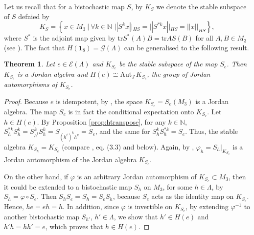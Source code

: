 \documentclass[12pt]{article}
\theoremstyle{plain}
\newtheorem{theorem}{Theorem}
\theoremstyle{definition}
\theoremstyle{remark}
\numberwithin{equation}{section}
\begin{document}
Let us recall that for a bistochastic map $S$, by 
$K_{S}$ we denote the stable subspace of $S$ defnied by
\begin{equation}
    K_{S} = \left \{ x \in M_{3} \:|\:
            \forall k \in \mathbb{N} \,\,
            || S^{k} x ||_{HS} = || S^{*k} x ||_{HS} =  ||x||_{HS}
    \right \},
\end{equation}
where $S^{*}$ is the adjoint map given by
$\text{tr} S^{*}(A) B = \text{tr} A S(B)$ for all $A, B \in M_{3}$
(see \cite[Eq. (3.3)]{miller2015stable}).
The fact that $H(\mathbf{1}_{8}) = \mathcal{G}(\Lambda)$
can be generalised to the following result.
\begin{theorem}
    Let $e \in \mathcal{E}(\Lambda)$ and
    $K_{S_{e}}$ be the stable subspace of the map $S_{e}$.
    Then $K_{S_{e}}$ is a Jordan algebra and
    $H(e) \cong \text{Aut}_{J} \, K_{S_{e}}$,
    the group of Jordan automorphisms of $K_{S_{e}}$.
\end{theorem}
\begin{proof}
    Because $e$ is idempotent, by
    \cite[Corollary 3]{miller2015stable},
    the space $K_{S_{e}} = S_{e}(M_{3})$ is a Jordan algebra.
    The map $S_{e}$ is in fact the conditional expectation onto $K_{S_{e}}$.
    Let $h \in H(e)$.
    By Proposition \ref{prop:htranspose}, for any $k\in \mathbb{N}$,
    $S_{h}^{* k} S_{h}^{k} = S_{h^{t}}^{k} S_{h}^{k} =  S_{(h^{t})^{k} h^{k}} = S_{e}$,
    and the same for $S_{h}^{k} S_{h}^{* k}= S_{e}$.
    Thus, the stable algebra $K_{S_{h}} = K_{S_{e}}$
    (compare \cite{miller2015stable}, eq. (3.3) and below).   
    Again, by \cite[Corollary 3]{miller2015stable},
    $\varphi_{h} = S_{h} \big |_{K_{S_{e}}}$
    is a Jordan automorphism of the Jordan algebra $K_{S_{e}}$.

    On the other hand, if
    $\varphi$ is an arbitrary Jordan automorphism of $K_{S_{e}} \subset M_{3}$,
    then it could be extended to a bistochastic map $S_{h}$ on $M_{3}$,
    for some $h \in \Lambda$,
    by $S_{h} = \varphi \circ S_{e}$.
    Then
    $S_{h} S_{e} = S_{h} = S_{e} S_{h}$,
    because $S_{e}$ acts as the identity map on $K_{S_{e}}$.
    Hence, $he = eh = h$.
    In addition, since $\varphi$ is invertible on $K_{S_{e}}$,
    by extending $\varphi^{-1}$ to another bistochastic map
    $S_{h'}$,  $h' \in \Lambda$,
    we show that $h' \in H(e)$ and $h' h = h h' = e$,
    which proves that $h \in H(e)$.
\end{proof}
\end{document}
